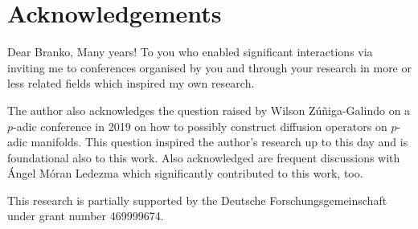 \documentclass[a4paper,draft]{ZbRad}
\theoremstyle{plain}
\theoremstyle{definition}
\numberwithin{equation}{section}
\begin{document}
\section*{Acknowledgements}
Dear Branko, Many years! To you who enabled significant interactions via inviting me to conferences organised by you and through your research in more or less related fields which inspired my own research.
\newline

The author also acknowledges the question raised by Wilson Z\'u\~niga-Galindo on a $p$-adic conference in 2019 on how to possibly construct diffusion operators on $p$-adic  manifolds. This question inspired the author's research up to this day and is foundational  also to this work. Also acknowledged are frequent discussions with \'Angel M\'oran Ledezma which significantly contributed to this work, too.
\newline

This research is partially supported by the
Deutsche Forschungsgemeinschaft
under grant number 469999674.
\end{document}
